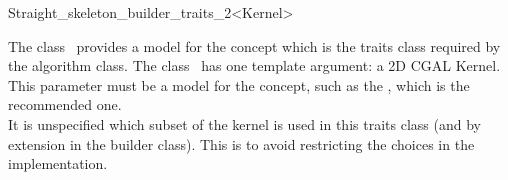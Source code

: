 

\begin{ccRefClass}{Straight_skeleton_builder_traits_2<Kernel>}


\ccDefinition

The class \ccRefName\ provides a model for the
 concept which is the traits class
required by the  algorithm class. The class 
\ccRefName\ has one template argument: a 2D CGAL Kernel. This parameter must be a model for the  concept, such as the , which is the recommended one.\\
It is unspecified which subset of the kernel is used in this traits class (and by extension in the builder class). This is to avoid restricting the choices in the implementation.


\ccIsModel
{}\\
\\
\\

\ccSeeAlso
{}

\end{ccRefClass}


